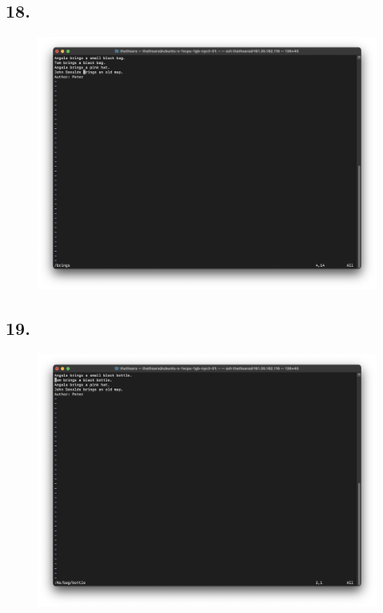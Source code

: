 \documentclass{article}
\begin{document}
    \subsection*{18.}
    \begin{figure}[H]
        \centering
        \includegraphics[width=\textwidth]{2/18.png}
    \end{figure}

    \subsection*{19.}
    \begin{figure}[H]
        \centering
        \includegraphics[width=\textwidth]{2/19.png}
    \end{figure}
\end{document}
